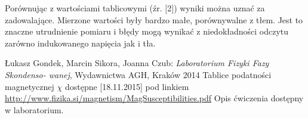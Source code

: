 \documentclass[11pt]{article}
\begin{document}
Porównując z wartościami tablicowymi (źr. $[$2$]$) wyniki można uznać za zadowalające. Mierzone wartości były bardzo małe, porównywalne z tłem. 
Jest to znaczne utrudnienie pomiaru i błędy mogą wynikać z niedokładności odczytu zarówno indukowanego napięcia jak i tła. 

\begin{thebibliography}{99}
 Łukasz Gondek, Marcin Sikora, Joanna Czub: \textit{Laboratorium Fizyki Fazy Skondenso-
wanej}, Wydawnictwa AGH, Kraków 2014
 Tablice podatności magnetycznej $\chi$ dostępne [18.11.2015] pod linkiem 
\url{http://www.fizika.si/magnetism/MagSusceptibilities.pdf}
 Opis ćwiczenia dostępny w laboratorium.
\end{thebibliography}
\end{document}
